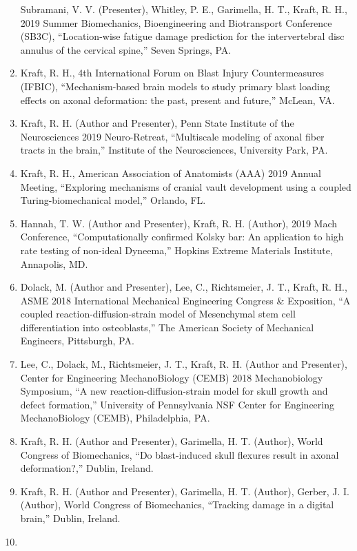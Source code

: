 \documentclass[11pt]{article}
\begin{document}
\begin{enumerate}
  Subramani, V. 
V. 
(Presenter), Whitley, P. 
E., Garimella, H. 
T., Kraft,
  R. 
H., 2019 Summer Biomechanics, Bioengineering and Biotransport
  Conference (SB3C), ``Location-wise fatigue damage prediction for the
  intervertebral disc annulus of the cervical spine,'' Seven Springs, PA.
\item
  Kraft, R. 
H., 4th International Forum on Blast Injury Countermeasures
  (IFBIC), ``Mechanism-based brain models to study primary blast loading
  effects on axonal deformation: the past, present and future,'' McLean,
  VA.
\item
  Kraft, R. 
H. 
(Author and Presenter), Penn State Institute of the
  Neurosciences 2019 Neuro-Retreat, ``Multiscale modeling of axonal fiber
  tracts in the brain,'' Institute of the Neurosciences, University Park,
  PA.
\item
  Kraft, R. 
H., American Association of Anatomists (AAA) 2019 Annual
  Meeting, ``Exploring mechanisms of cranial vault development using a
  coupled Turing-biomechanical model,'' Orlando, FL.
\item
  Hannah, T. 
W. 
(Author and Presenter), Kraft, R. 
H. 
(Author), 2019 Mach
  Conference, ``Computationally confirmed Kolsky bar: An application to
  high rate testing of non-ideal Dyneema,'' Hopkins Extreme Materials
  Institute, Annapolis, MD.
\item
  Dolack, M. 
(Author and Presenter), Lee, C., Richtsmeier, J. 
T., Kraft,
  R. 
H., ASME 2018 International Mechanical Engineering Congress \&
  Exposition, ``A coupled reaction-diffusion-strain model of Mesenchymal
  stem cell differentiation into osteoblasts,'' The American Society of
  Mechanical Engineers, Pittsburgh, PA.
\item
  Lee, C., Dolack, M., Richtsmeier, J. 
T., Kraft, R. 
H. 
(Author and
  Presenter), Center for Engineering MechanoBiology (CEMB) 2018
  Mechanobiology Symposium, ``A new reaction-diffusion-strain model for
  skull growth and defect formation,'' University of Pennsylvania NSF
  Center for Engineering MechanoBiology (CEMB), Philadelphia, PA.
\item
  Kraft, R. 
H. 
(Author and Presenter), Garimella, H. 
T. 
(Author), World
  Congress of Biomechanics, ``Do blast-induced skull flexures result in
  axonal deformation?,'' Dublin, Ireland.
\item
  Kraft, R. 
H. 
(Author and Presenter), Garimella, H. 
T. 
(Author),
  Gerber, J. 
I. 
(Author), World Congress of Biomechanics, ``Tracking
  damage in a digital brain,'' Dublin, Ireland.
\item

\end{enumerate}
\end{document}
